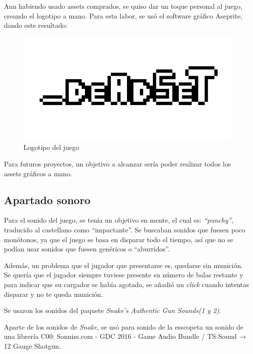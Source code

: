 \documentclass[12pt]{article}
\begin{document}
        Aun habiendo usado assets comprados, se quiso dar un toque personal al juego, creando el logotipo a mano. Para esta labor, se usó el software gráfico Aseprite, dando este resultado:
        \begin{figure}[H]
            \centering
            \includegraphics[width=\textwidth]{Images/logo_big.png}
            \caption{Logotipo del juego}
        \end{figure}
        
        Para futuros proyectos, un objetivo a alcanzar sería poder realizar todos los assets gráficos a mano.
    
    \subsection{Apartado sonoro}
        
        Para el sonido del juego, se tenía un objetivo en mente, el cual es: \textit{“punchy”}, traducido al castellano como “impactante”. Se buscaban sonidos que fuesen poco monótonos, ya que el juego se basa en disparar todo el tiempo, así que no se podían usar sonidos que fuesen genéricos o “aburridos”. 

        Además, un problema que el jugador que presentarse es, quedarse sin munición. Se quería que el jugador siempre tuviese presente su número de balas restante y para indicar que su cargador se había agotado, se añadió un \textit{click} cuando intentas disparar y no te queda munición. 
        
        Se usaron los sonidos del paquete \textit{Snake's Authentic Gun Sounds(1 y 2)}.
        
        Aparte de los sonidos de \textit{Snake}, se usó para sonido de la esscopeta un sonido de una librería C00: Sonniss.com - GDC 2016 - Game Audio Bundle / TS Sound → 12 Gauge Shotgun.
        
\end{document}

